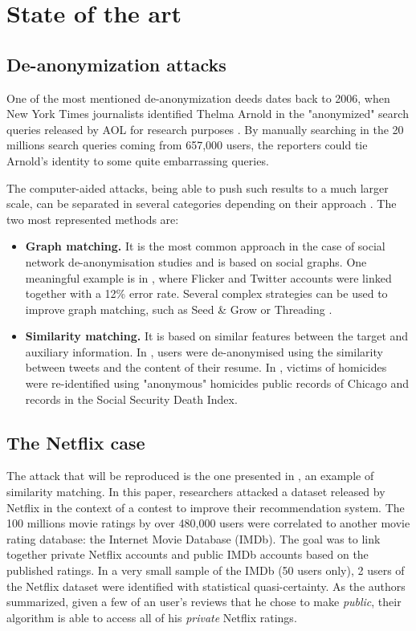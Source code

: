 \section{State of the art}\label{sec:state}

\subsection{De-anonymization attacks}

One of the most mentioned de-anonymization deeds dates back to 2006, when New York Times journalists identified Thelma Arnold in the "anonymized" search queries released by AOL for research purposes \cite{nytimes}. By manually searching in the 20 millions search queries coming from 657,000 users, the reporters could tie Arnold's identity to some quite embarrassing queries.

The computer-aided attacks, being able to push such results to a much larger scale, can be separated in several categories depending on their approach \cite{survey}. The two most represented methods are:

\begin{itemize}
	\item \textbf{Graph matching.} It is the most common approach in the case of social network de-anonymisation studies and is based on social graphs. One meaningful example is in \cite{graph_twitter}, where Flicker and Twitter accounts were linked together with a 12\% error rate. Several complex strategies can be used to improve graph matching, such as Seed \& Grow \cite{seed} or Threading \cite{threading}.
	
	\item \textbf{Similarity matching.} It is based on similar features between the target and auxiliary information. In \cite{tweets}, users were de-anonymised using the similarity between tweets and the content of their resume. In \cite{homicide}, victims of homicides were re-identified using "anonymous" homicides public records of Chicago and records in the Social Security Death Index.
\end{itemize}

\subsection{The Netflix case}

The attack that will be reproduced is the one presented in \cite{netflix}, an example of similarity matching. In this paper, researchers attacked a dataset released by Netflix in the context of a contest to improve their recommendation system. The 100 millions movie ratings by over 480,000 users were correlated to another movie rating database: the Internet Movie Database (IMDb). The goal was to link together private Netflix accounts and public IMDb accounts based on the published ratings. In a very small sample of the IMDb (50 users only), 2 users of the Netflix dataset were identified with statistical quasi-certainty. As the authors summarized, given a few of an user's reviews that he chose to make \textit{public}, their algorithm is able to access all of his \textit{private} Netflix ratings. 


